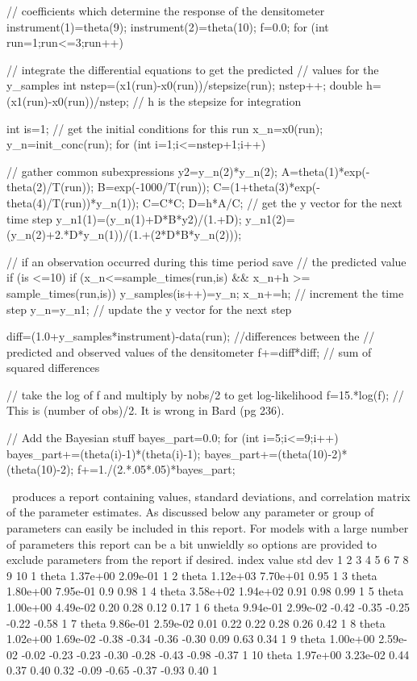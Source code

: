 \documentclass[12pt]{book}
\begin{document}
    // coefficients which determine the response of the densitometer
    instrument(1)=theta(9);
    instrument(2)=theta(10);
    f=0.0;
    for (int run=1;run<=3;run++)
    {
       // integrate the differential equations to get the predicted
       // values for the y_samples
      int nstep=(x1(run)-x0(run))/stepsize(run);
      nstep++;
      double h=(x1(run)-x0(run))/nstep; // h is the stepsize for integration

      int is=1;
      // get the initial conditions for this run
      x_n=x0(run);
      y_n=init_conc(run);
      for (int i=1;i<=nstep+1;i++)
      {
        // gather common subexpressions
        y2=y_n(2)*y_n(2);
        A=theta(1)*exp(-theta(2)/T(run));
        B=exp(-1000/T(run));
        C=(1+theta(3)*exp(-theta(4)/T(run))*y_n(1));
        C=C*C;
        D=h*A/C;
        // get the y vector for the next time step
        y_n1(1)=(y_n(1)+D*B*y2)/(1.+D);
        y_n1(2)=(y_n(2)+2.*D*y_n(1))/(1.+(2*D*B*y_n(2)));

        // if an observation occurred during this time period save
        // the predicted value
        if (is <=10)
        {
          if (x_n<=sample_times(run,is) && x_n+h >= sample_times(run,is))
          {
            y_samples(is++)=y_n;
          }
        }
        x_n+=h;  // increment the time step
        y_n=y_n1;  // update the y vector for the next step

      }
      diff=(1.0+y_samples*instrument)-data(run); //differences between the
                 // predicted and observed values of the densitometer 
      f+=diff*diff;  // sum of squared differences
    }
    // take the log of f and multiply by nobs/2 to get log-likelihood
    f=15.*log(f); // This is (number of obs)/2. It is wrong in Bard (pg 236).

    // Add the Bayesian stuff
    bayes_part=0.0;
    for  (int i=5;i<=9;i++)
    {
      bayes_part+=(theta(i)-1)*(theta(i)-1); 
    }
    bayes_part+=(theta(10)-2)*(theta(10)-2);
    f+=1./(2.*.05*.05)*bayes_part;

\endexample
\ADM\ produces  a report containing values, standard deviations,
and correlation matrix of the parameter estimates. As discussed below 
any parameter or group of parameters can easily be included in this
report. For models with a large number of parameters this report
can be a bit unwieldly so options are provided to exclude parameters
from the report if desired. 
\htmlbegintex
{ \openup -2pt
\obeylines\obeyspaces\tteight
 index          value   std dev     1     2     3     4     5     6     7     8     9     10   
    1   theta  1.37e+00 2.09e-01     1
    2   theta  1.12e+03 7.70e+01  0.95     1
    3   theta  1.80e+00 7.95e-01   0.9  0.98     1
    4   theta  3.58e+02 1.94e+02  0.91  0.98  0.99     1
    5   theta  1.00e+00 4.49e-02  0.20  0.28  0.12  0.17     1
    6   theta  9.94e-01 2.99e-02 -0.42 -0.35 -0.25 -0.22 -0.58     1
    7   theta  9.86e-01 2.59e-02  0.01  0.22  0.22  0.28  0.26  0.42     1
    8   theta  1.02e+00 1.69e-02 -0.38 -0.34 -0.36 -0.30  0.09  0.63  0.34     1
    9   theta  1.00e+00 2.59e-02 -0.02 -0.23 -0.23 -0.30 -0.28 -0.43 -0.98 -0.37     1
   10   theta  1.97e+00 3.23e-02  0.44  0.37  0.40  0.32 -0.09 -0.65 -0.37  -0.93  0.40    1
}
\htmlendtex
\end{document}
